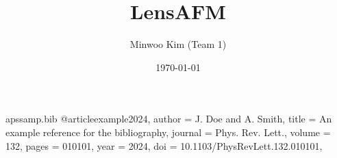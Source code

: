 \begin{filecontents}[overwrite]{apssamp.bib}
@article{example2024,
  author  = {J. Doe and A. Smith},
  title   = {An example reference for the bibliography},
  journal = {Phys. Rev. Lett.},
  volume  = {132},
  pages   = {010101},
  year    = {2024},
  doi     = {10.1103/PhysRevLett.132.010101},
}
\end{filecontents}
%
%
%
%
%
%
%
\documentclass[%
 reprint,
 amsmath,amssymb,
 aps,
]{revtex4-2}

\usepackage{graphicx}%
\usepackage{dcolumn}%
\usepackage{bm}%
\usepackage{float}





\title{LensAFM}

\author{Minwoo Kim (Team 1)}

\date{\today}%


